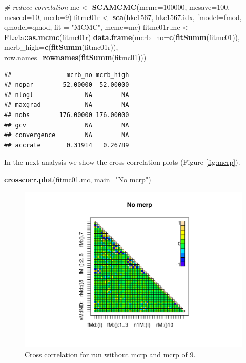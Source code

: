 \documentclass[
]{book}
\newenvironment{Shaded}{\begin{snugshade}}{\end{snugshade}}
\newcommand{\AttributeTok}[1]{\textcolor[rgb]{0.13,0.29,0.53}{#1}}
\newcommand{\CommentTok}[1]{\textcolor[rgb]{0.56,0.35,0.01}{\textit{#1}}}
\newcommand{\DecValTok}[1]{\textcolor[rgb]{0.00,0.00,0.81}{#1}}
\newcommand{\FunctionTok}[1]{\textcolor[rgb]{0.13,0.29,0.53}{\textbf{#1}}}
\newcommand{\NormalTok}[1]{#1}
\newcommand{\OtherTok}[1]{\textcolor[rgb]{0.56,0.35,0.01}{#1}}
\newcommand{\SpecialCharTok}[1]{\textcolor[rgb]{0.81,0.36,0.00}{\textbf{#1}}}
\newcommand{\StringTok}[1]{\textcolor[rgb]{0.31,0.60,0.02}{#1}}
\begin{document}
\begin{Shaded}
\begin{Highlighting}[]
\CommentTok{\# reduce correlation}
\NormalTok{mc }\OtherTok{\textless{}{-}} \FunctionTok{SCAMCMC}\NormalTok{(}\AttributeTok{mcmc=}\DecValTok{100000}\NormalTok{, }\AttributeTok{mcsave=}\DecValTok{100}\NormalTok{, }\AttributeTok{mcseed=}\DecValTok{10}\NormalTok{, }\AttributeTok{mcrb=}\DecValTok{9}\NormalTok{)}
\NormalTok{fitmc01r }\OtherTok{\textless{}{-}} \FunctionTok{sca}\NormalTok{(hke1567, hke1567.idx, }\AttributeTok{fmodel=}\NormalTok{fmod, }\AttributeTok{qmodel=}\NormalTok{qmod, }\AttributeTok{fit =} \StringTok{"MCMC"}\NormalTok{, }\AttributeTok{mcmc=}\NormalTok{mc)}
\NormalTok{fitmc01r.mc }\OtherTok{\textless{}{-}}\NormalTok{ FLa4a}\SpecialCharTok{::}\FunctionTok{as.mcmc}\NormalTok{(fitmc01r)}
\FunctionTok{data.frame}\NormalTok{(}\AttributeTok{mcrb\_no=}\FunctionTok{c}\NormalTok{(}\FunctionTok{fitSumm}\NormalTok{(fitmc01)),}
    \AttributeTok{mcrb\_high=}\FunctionTok{c}\NormalTok{(}\FunctionTok{fitSumm}\NormalTok{(fitmc01r)),}
    \AttributeTok{row.names=}\FunctionTok{rownames}\NormalTok{(}\FunctionTok{fitSumm}\NormalTok{(fitmc01)))}
\end{Highlighting}
\end{Shaded}

\begin{verbatim}
##               mcrb_no mcrb_high
## nopar        52.00000  52.00000
## nlogl              NA        NA
## maxgrad            NA        NA
## nobs        176.00000 176.00000
## gcv                NA        NA
## convergence        NA        NA
## accrate       0.31914   0.26789
\end{verbatim}

In the next analysis we show the cross-correlation plots (Figure \ref{fig:mcrp}).

\begin{Shaded}
\begin{Highlighting}[]
\FunctionTok{crosscorr.plot}\NormalTok{(fitmc01.mc, }\AttributeTok{main=}\StringTok{"No mcrp"}\NormalTok{)}
\end{Highlighting}
\end{Shaded}

\begin{figure}
\includegraphics[width=0.5\linewidth]{_bookdown_files/_main_files/figure-html/mcrp-1} \caption{Cross correlation for run without mcrp and mcrp of 9.}\label{fig:mcrp-1}
\end{figure}
\end{document}
